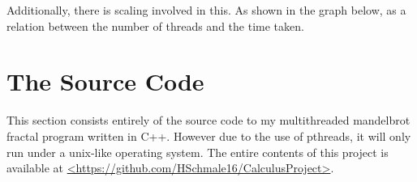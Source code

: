 \documentclass[10pt,oneside,letter]{article}
\begin{document}
Additionally, there is scaling involved in this. As shown in the graph
below, as a relation between the number of threads and the time taken.


\section{The Source Code}
This section consists entirely of the source code to my multithreaded
mandelbrot fractal program written in C++. However due to the use of
pthreads, it will only run under a unix-like operating system. The 
entire contents of this project is available at 
\url{<https://github.com/HSchmale16/CalculusProject>}.

\end{document}
